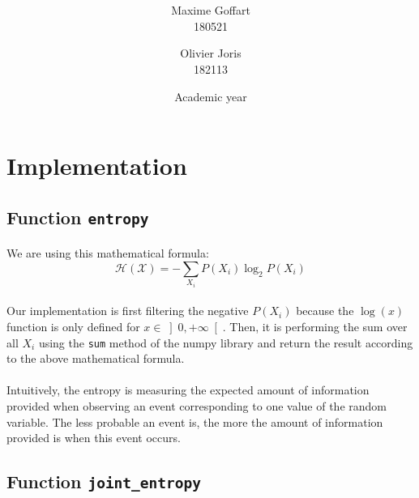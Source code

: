 \documentclass[a4paper, 11pt, oneside]{article}
\title{\ClassName\\\vspace*{0.8cm}\ProjectName\vspace{1cm}}
\author{Maxime Goffart \\180521 \and Olivier Joris\\182113}
\date{\vspace{1cm}Academic year \AcademicYear}
\begin{document}
\begin{titlingpage}
{\let\newpage\relax\maketitle}
\end{titlingpage}

\thispagestyle{empty}
\newpage




\section{Implementation}

\subsection{Function \texttt{entropy}}

\paragraph{}We are using this mathematical formula: 
$$ \mathcal{H}(\mathcal{X}) = - \sum_{X_i} P(X_i) \log_2{P(X_i)} $$

\paragraph{}Our implementation is first filtering the negative $P(X_i)$ because 
the $\log(x)$ function is only defined for \(x \in \left]0, +\infty\right[\).
Then, it is performing the sum over all $X_i$ using the \texttt{sum} method of the numpy library and return the result according to the above mathematical formula.

\paragraph{}Intuitively, the entropy is measuring the expected amount of information provided when observing an event corresponding to one value of the random variable. The less probable an event is, the more the amount of information provided is when this event occurs.

\subsection{Function \texttt{joint\_entropy}}
\end{document}
